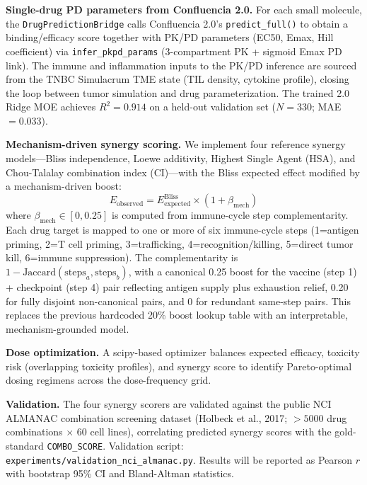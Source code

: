 \documentclass[12pt]{article}
\begin{document}
\textbf{Single-drug PD parameters from Confluencia 2.0.} For each small molecule, the \texttt{DrugPredictionBridge} calls Confluencia 2.0's \texttt{predict\_full()} to obtain a binding/efficacy score together with PK/PD parameters (EC50, Emax, Hill coefficient) via \texttt{infer\_pkpd\_params} (3-compartment PK + sigmoid Emax PD link). The immune and inflammation inputs to the PK/PD inference are sourced from the TNBC Simulacrum TME state (TIL density, cytokine profile), closing the loop between tumor simulation and drug parameterization. The trained 2.0 Ridge MOE achieves $R^2 = 0.914$ on a held-out validation set ($N=330$; MAE $=0.033$).

\textbf{Mechanism-driven synergy scoring.} We implement four reference synergy models---Bliss independence, Loewe additivity, Highest Single Agent (HSA), and Chou-Talalay combination index (CI)---with the Bliss expected effect modified by a mechanism-driven boost:
\begin{equation}
E_{\text{observed}} = E_{\text{expected}}^{\text{Bliss}} \times (1 + \beta_{\text{mech}})
\end{equation}
where $\beta_{\text{mech}} \in [0, 0.25]$ is computed from immune-cycle step complementarity. Each drug target is mapped to one or more of six immune-cycle steps (1=antigen priming, 2=T cell priming, 3=trafficking, 4=recognition/killing, 5=direct tumor kill, 6=immune suppression). The complementarity is $1 - \mathrm{Jaccard}(\text{steps}_a, \text{steps}_b)$, with a canonical 0.25 boost for the vaccine (step 1) + checkpoint (step 4) pair reflecting antigen supply plus exhaustion relief, 0.20 for fully disjoint non-canonical pairs, and 0 for redundant same-step pairs. This replaces the previous hardcoded 20\% boost lookup table with an interpretable, mechanism-grounded model.

\textbf{Dose optimization.} A scipy-based optimizer balances expected efficacy, toxicity risk (overlapping toxicity profiles), and synergy score to identify Pareto-optimal dosing regimens across the dose-frequency grid.

\textbf{Validation.} The four synergy scorers are validated against the public NCI ALMANAC combination screening dataset (Holbeck et al., 2017; $>5000$ drug combinations $\times$ 60 cell lines), correlating predicted synergy scores with the gold-standard \texttt{COMBO\_SCORE}. Validation script: \texttt{experiments/validation\_nci\_almanac.py}. Results will be reported as Pearson $r$ with bootstrap 95\% CI and Bland-Altman statistics.
\end{document}
